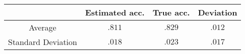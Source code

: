 \begin{tabular}{cccc}
  \toprule
                     & Estimated acc. & True acc. & Deviation \\
  \midrule
  Average            & $.811$         & $.829$    & $.012$    \\
  Standard Deviation & $.018$         & $.023$    & $.017$    \\
  \bottomrule
\end{tabular}
